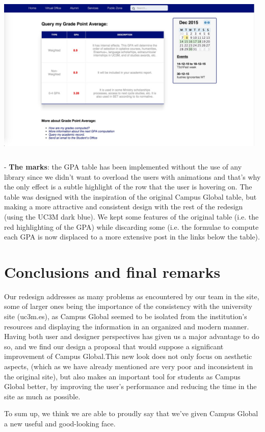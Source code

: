 \documentclass{article}
\begin{document}
\begin{center} 
\includegraphics[width=13cm, height=8cm, keepaspectratio]{imp_notamedia}
\end{center} 

- \textbf{The marks}: the GPA table has been implemented without the use of any library since we didn't want to overload the users with animations and that's why the only effect is a subtle
highlight of the row that the user is hovering on. The table was designed with the
inspiration of the original Campus Global table, but making a more attractive and
consistent design with the rest of the redesign (using the UC3M dark blue). We
kept some features of the original table (i.e. the red highlighting of the GPA)
while discarding some (i.e. the formulae to compute each GPA is now displaced to
a more extensive post in the links below the table).

\section{Conclusions and final remarks}

Our redesign addresses as many problems as encountered by our team in the site, some of larger ones being the importance of the consistency with the university site (uc3m.es), as Campus Global seemed to be isolated from the institution’s resources and displaying the information in an organized and modern manner. Having both user and designer perspectives has given us a major advantage to do so, and we find our design a proposal that would suppose a significant improvement of Campus Global.This new look does not only focus on aesthetic aspects, (which as we have already mentioned are very poor and inconsistent in the original site), but also makes an important tool for students as Campus Global better, by improving the user's performance and reducing the time in the site as much as possible.

To sum up, we think we are able to proudly say that we've given Campus Global a new useful and good-looking face.
\end{document}
